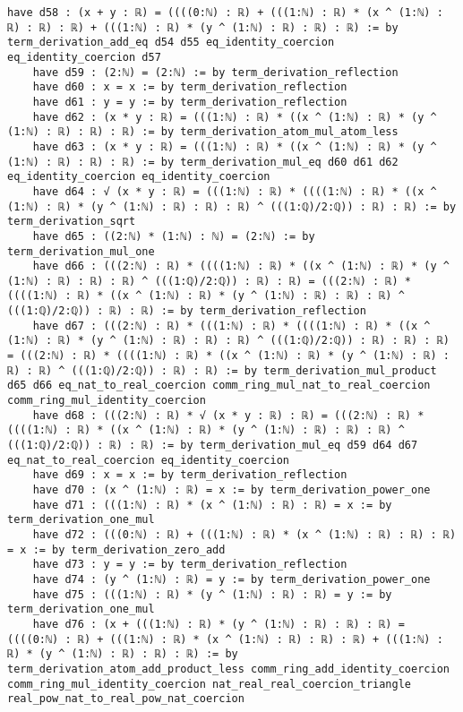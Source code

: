 \documentclass{article}
\begin{document}
\begin{tcolorbox}[colback=white!10, width=\linewidth]
\begin{lstlisting}[language=Lean4]
    have d58 : (x + y : ℝ) = ((((0:ℕ) : ℝ) + (((1:ℕ) : ℝ) * (x ^ (1:ℕ) : ℝ) : ℝ) : ℝ) + (((1:ℕ) : ℝ) * (y ^ (1:ℕ) : ℝ) : ℝ) : ℝ) := by term_derivation_add_eq d54 d55 eq_identity_coercion eq_identity_coercion d57
    have d59 : (2:ℕ) = (2:ℕ) := by term_derivation_reflection
    have d60 : x = x := by term_derivation_reflection
    have d61 : y = y := by term_derivation_reflection
    have d62 : (x * y : ℝ) = (((1:ℕ) : ℝ) * ((x ^ (1:ℕ) : ℝ) * (y ^ (1:ℕ) : ℝ) : ℝ) : ℝ) := by term_derivation_atom_mul_atom_less
    have d63 : (x * y : ℝ) = (((1:ℕ) : ℝ) * ((x ^ (1:ℕ) : ℝ) * (y ^ (1:ℕ) : ℝ) : ℝ) : ℝ) := by term_derivation_mul_eq d60 d61 d62 eq_identity_coercion eq_identity_coercion
    have d64 : √ (x * y : ℝ) = (((1:ℕ) : ℝ) * ((((1:ℕ) : ℝ) * ((x ^ (1:ℕ) : ℝ) * (y ^ (1:ℕ) : ℝ) : ℝ) : ℝ) ^ (((1:ℚ)/2:ℚ)) : ℝ) : ℝ) := by term_derivation_sqrt
    have d65 : ((2:ℕ) * (1:ℕ) : ℕ) = (2:ℕ) := by term_derivation_mul_one
    have d66 : (((2:ℕ) : ℝ) * ((((1:ℕ) : ℝ) * ((x ^ (1:ℕ) : ℝ) * (y ^ (1:ℕ) : ℝ) : ℝ) : ℝ) ^ (((1:ℚ)/2:ℚ)) : ℝ) : ℝ) = (((2:ℕ) : ℝ) * ((((1:ℕ) : ℝ) * ((x ^ (1:ℕ) : ℝ) * (y ^ (1:ℕ) : ℝ) : ℝ) : ℝ) ^ (((1:ℚ)/2:ℚ)) : ℝ) : ℝ) := by term_derivation_reflection
    have d67 : (((2:ℕ) : ℝ) * (((1:ℕ) : ℝ) * ((((1:ℕ) : ℝ) * ((x ^ (1:ℕ) : ℝ) * (y ^ (1:ℕ) : ℝ) : ℝ) : ℝ) ^ (((1:ℚ)/2:ℚ)) : ℝ) : ℝ) : ℝ) = (((2:ℕ) : ℝ) * ((((1:ℕ) : ℝ) * ((x ^ (1:ℕ) : ℝ) * (y ^ (1:ℕ) : ℝ) : ℝ) : ℝ) ^ (((1:ℚ)/2:ℚ)) : ℝ) : ℝ) := by term_derivation_mul_product d65 d66 eq_nat_to_real_coercion comm_ring_mul_nat_to_real_coercion comm_ring_mul_identity_coercion
    have d68 : (((2:ℕ) : ℝ) * √ (x * y : ℝ) : ℝ) = (((2:ℕ) : ℝ) * ((((1:ℕ) : ℝ) * ((x ^ (1:ℕ) : ℝ) * (y ^ (1:ℕ) : ℝ) : ℝ) : ℝ) ^ (((1:ℚ)/2:ℚ)) : ℝ) : ℝ) := by term_derivation_mul_eq d59 d64 d67 eq_nat_to_real_coercion eq_identity_coercion
    have d69 : x = x := by term_derivation_reflection
    have d70 : (x ^ (1:ℕ) : ℝ) = x := by term_derivation_power_one
    have d71 : (((1:ℕ) : ℝ) * (x ^ (1:ℕ) : ℝ) : ℝ) = x := by term_derivation_one_mul
    have d72 : (((0:ℕ) : ℝ) + (((1:ℕ) : ℝ) * (x ^ (1:ℕ) : ℝ) : ℝ) : ℝ) = x := by term_derivation_zero_add
    have d73 : y = y := by term_derivation_reflection
    have d74 : (y ^ (1:ℕ) : ℝ) = y := by term_derivation_power_one
    have d75 : (((1:ℕ) : ℝ) * (y ^ (1:ℕ) : ℝ) : ℝ) = y := by term_derivation_one_mul
    have d76 : (x + (((1:ℕ) : ℝ) * (y ^ (1:ℕ) : ℝ) : ℝ) : ℝ) = ((((0:ℕ) : ℝ) + (((1:ℕ) : ℝ) * (x ^ (1:ℕ) : ℝ) : ℝ) : ℝ) + (((1:ℕ) : ℝ) * (y ^ (1:ℕ) : ℝ) : ℝ) : ℝ) := by term_derivation_atom_add_product_less comm_ring_add_identity_coercion comm_ring_mul_identity_coercion nat_real_real_coercion_triangle real_pow_nat_to_real_pow_nat_coercion

\end{lstlisting}
\end{tcolorbox}
\end{document}
